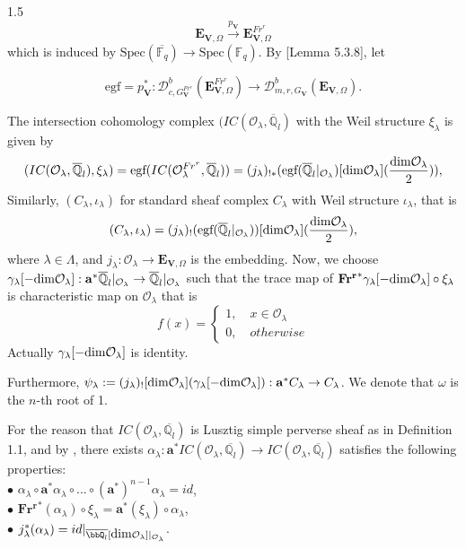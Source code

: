 \documentclass[10pt]{amsart}
\def\dim{\mbox{\rm dim}}   \def\End{\mbox{\rm End}}
\def\bfV{{\mathbf V}}
\def\bfV{\mathbf{V}}
\newcommand\bbq{{\mathbb Q}}
\newcommand\mo{{\mathcal{O}}}
\begin{document}
\begin{spacing}{1.5}
$$\mathbf{E}_{\mathbf{V}, \Omega}\xrightarrow{p_{\bfV}} \mathbf{E}_{\mathbf{V}, \Omega}^{Fr^r}$$ which is induced by $\text{Spec}(\overline{\mathbb{F}_q})\rightarrow \text{Spec}(\mathbb{F}_q)$. By \cite{Pramod-2021}[Lemma 5.3.8], let

$$
\text{egf}=p_{\bfV}^*: \mathcal{D}^b_{c,G_{\bfV}^{Fr^r}}(\mathbf{E}_{\mathbf{V}, \Omega}^{Fr^r}) \to \mathcal{D}^b_{m,r,G_{\bfV}}(\mathbf{E}_{\mathbf{V}, \Omega}).
$$

The intersection cohomology complex $(IC(\mathcal{O}_{\lambda}, \overline{\mathbb{Q}}_l)$ with the Weil structure $\xi_{\lambda}$ is given by 
$$
(IC(\mathcal{O}_{\lambda}, \overline{\mathbb{Q}}_l), \xi_{\lambda}) = \text{egf}(IC(\mathcal{O}_{\lambda}^{Fr^r}, \overline{\mathbb{Q}}_l))=(j_{\lambda})_{!*}(\text{egf}(\overline{\mathbb{Q}}_l|_{\mathcal{O}_{\lambda}})[\dim \mo_{\lambda}](\frac{\dim \mo_{\lambda}}{2})),
$$
Similarly, $(C_{\lambda}, \iota_{\lambda})$ for standard sheaf complex $C_{\lambda}$ with Weil structure $\iota_{\lambda}$, that is
$$
(C_{\lambda}, \iota_{\lambda}) = (j_{\lambda})_!(\text{egf}(\overline{\mathbb{Q}}_l|_{\mathcal{O}_{\lambda}}))[\dim \mathcal{O}_{\lambda}](\frac{\dim \mathcal{O}_{\lambda}}{2}),
$$
where $\lambda \in \Lambda$, and $j_{\lambda}: \mathcal{O}_{\lambda} \to \mathbf{E}_{\mathbf{V}, \Omega}$ is the embedding. Now, we choose $\gamma_{\lambda}[-\dim \mathcal{O}_{\lambda}]: \mathbf{a}^*\overline{\mathbb{Q}}_l|_{\mathcal{O}_{\lambda}} \to \overline{\mathbb{Q}}_l|_{\mathcal{O}_{\lambda}}$ such that the trace map of $\mathbf{Fr^r}^*\gamma_{\lambda}[-\dim \mathcal{O}_{\lambda}] \circ \xi_{\lambda}$ is characteristic map on $\mo_{\lambda}$ that is $$f(x)=\left\{
\begin{array}{l}
1, \quad x\in \mo_{\lambda} \\
0, \quad otherwise
\end{array}
\right.$$ Actually $\gamma_{\lambda}[-\dim \mathcal{O}_{\lambda}]$ is identity.

Furthermore, $\psi_{\lambda}:=(j_{\lambda})_![\dim \mathcal{O}_{\lambda}](\gamma_{\lambda}[-\dim \mathcal{O}_{\lambda}]): \mathbf{a}^*C_{\lambda} \to C_{\lambda}$. We denote that $\omega$ is the $n$-th root of 1.

For the reason that $IC(\mo_{\lambda},\overline{\bbq_l})$ is Lusztig simple perverse sheaf as in Definition 1.1, and by \cite{lusztig1998canonical}, there exists $\alpha_{\lambda}: \mathbf{a}^*IC(\mo_{\lambda},\overline{\bbq_l})\rightarrow IC(\mo_{\lambda},\overline{\bbq_l})$ satisfies the following properties:\\
$\bullet$ $\alpha_{\lambda}\circ \mathbf{a}^*\alpha_{\lambda}\circ ... \circ (\mathbf{a}^*)^{n-1}\alpha_{\lambda}=id$,\\
$\bullet$ $\mathbf{Fr^r}^*(\alpha_{\lambda})\circ \xi_{\lambda}=\mathbf{a}^*(\xi_{\lambda})\circ \alpha_{\lambda}$,\\
$\bullet$ $j_{\lambda}^*(\alpha_{\lambda})=id|_{\overline{\bbQ_l}[\dim\mo_{\lambda}]|_{\mo_{\lambda}}}$.


\end{spacing}
\end{document}
